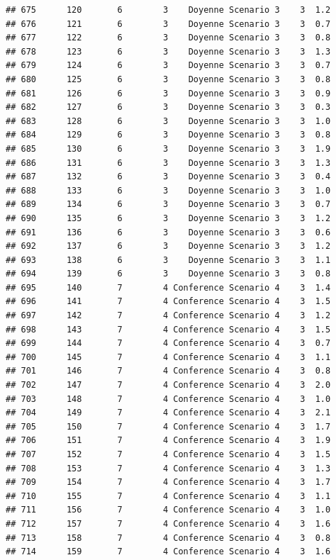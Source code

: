 \documentclass[
]{article}
\begin{document}
\begin{verbatim}
## 675      120       6        3    Doyenne Scenario 3    3  1.2
## 676      121       6        3    Doyenne Scenario 3    3  0.7
## 677      122       6        3    Doyenne Scenario 3    3  0.8
## 678      123       6        3    Doyenne Scenario 3    3  1.3
## 679      124       6        3    Doyenne Scenario 3    3  0.7
## 680      125       6        3    Doyenne Scenario 3    3  0.8
## 681      126       6        3    Doyenne Scenario 3    3  0.9
## 682      127       6        3    Doyenne Scenario 3    3  0.3
## 683      128       6        3    Doyenne Scenario 3    3  1.0
## 684      129       6        3    Doyenne Scenario 3    3  0.8
## 685      130       6        3    Doyenne Scenario 3    3  1.9
## 686      131       6        3    Doyenne Scenario 3    3  1.3
## 687      132       6        3    Doyenne Scenario 3    3  0.4
## 688      133       6        3    Doyenne Scenario 3    3  1.0
## 689      134       6        3    Doyenne Scenario 3    3  0.7
## 690      135       6        3    Doyenne Scenario 3    3  1.2
## 691      136       6        3    Doyenne Scenario 3    3  0.6
## 692      137       6        3    Doyenne Scenario 3    3  1.2
## 693      138       6        3    Doyenne Scenario 3    3  1.1
## 694      139       6        3    Doyenne Scenario 3    3  0.8
## 695      140       7        4 Conference Scenario 4    3  1.4
## 696      141       7        4 Conference Scenario 4    3  1.5
## 697      142       7        4 Conference Scenario 4    3  1.2
## 698      143       7        4 Conference Scenario 4    3  1.5
## 699      144       7        4 Conference Scenario 4    3  0.7
## 700      145       7        4 Conference Scenario 4    3  1.1
## 701      146       7        4 Conference Scenario 4    3  0.8
## 702      147       7        4 Conference Scenario 4    3  2.0
## 703      148       7        4 Conference Scenario 4    3  1.0
## 704      149       7        4 Conference Scenario 4    3  2.1
## 705      150       7        4 Conference Scenario 4    3  1.7
## 706      151       7        4 Conference Scenario 4    3  1.9
## 707      152       7        4 Conference Scenario 4    3  1.5
## 708      153       7        4 Conference Scenario 4    3  1.3
## 709      154       7        4 Conference Scenario 4    3  1.7
## 710      155       7        4 Conference Scenario 4    3  1.1
## 711      156       7        4 Conference Scenario 4    3  1.0
## 712      157       7        4 Conference Scenario 4    3  1.6
## 713      158       7        4 Conference Scenario 4    3  0.8
## 714      159       7        4 Conference Scenario 4    3  1.6

\end{verbatim}
\end{document}
